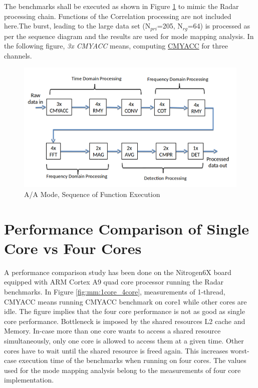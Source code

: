 The benchmarks shall be executed as shown in Figure \ref{fig:bg_related_work:aa_seq} to mimic the Radar processing chain. Functions of the Correlation processing are not included here.The burst, leading to the large data set (N$_{pri}$=205, N$_{rg}$=64) is processed as per the sequence diagram and the results are used for mode mapping analysis. In the following figure, \textsl{3x CMYACC} means, computing \hyperlink{benchmarks}{CMYACC} for three channels.

\begin{figure}[h!]
	\centering
	\includegraphics[width=160mm]{figures/aa_seq}
	\caption{A/A Mode, Sequence of Function Execution}
	\label{fig:bg_related_work:aa_seq}
\end{figure}

\clearpage
\section{Performance Comparison of Single Core vs Four Cores}
\label{sec:mm:perf_comp}
A performance comparison study has been done on the Nitrogen6X board equipped with ARM Cortex A9 quad core processor running the Radar benchmarks. In Figure \ref{fig:mm:1core_4core}, measurements of 1-thread, CMYACC means running CMYACC benchmark on core1 while other cores are idle. The figure implies that the four core performance is not as good as single core performance. Bottleneck is imposed by the shared resources L2 cache and Memory. In-case more than one core wants to access a shared resource simultaneously, only one core is allowed to access them at a given time. Other cores have to wait until the shared resource is freed again. This increases worst-case execution time of the benchmarks when running on four cores. The values used for the mode mapping analysis belong to the measurements of four core implementation.

